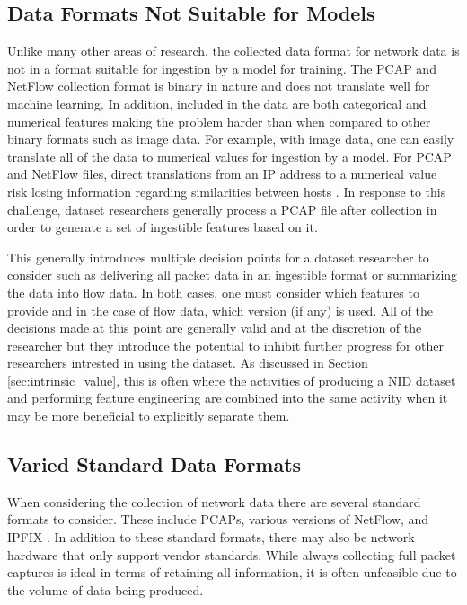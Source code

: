 \documentclass[sigconf]{acmart}
\begin{document}
\subsection{Data Formats Not Suitable for Models}\label{subsec:collectionformat}
Unlike many other areas of research, the collected data format for network data is not in a format suitable for ingestion by a model for training.
The PCAP and NetFlow collection format is binary in nature and does not translate well for machine learning.
In addition, included in the data are both categorical and numerical features making the problem harder than when compared to other binary formats such as image data. 
For example, with image data, one can easily translate all of the data to numerical values for ingestion by a model.
For PCAP and NetFlow files, direct translations from an IP address to a numerical value risk losing information regarding similarities between hosts \cite{ringip2vec}.
In response to this challenge, dataset researchers generally process a PCAP file after collection in order to generate a set of ingestible features based on it.

This generally introduces multiple decision points for a dataset researcher to consider such as delivering all packet data in an ingestible format or summarizing the data into flow data. 
In both cases, one must consider which features to provide and in the case of flow data, which version (if any) is used.
All of the decisions made at this point are generally valid and at the discretion of the researcher but they introduce the potential to inhibit further progress for other researchers intrested in using the dataset.
As discussed in Section \ref{sec:intrinsic_value}, this is often where the activities of producing a NID dataset and performing feature engineering are combined into the same activity when it may be more beneficial to explicitly separate them.

\subsection{Varied Standard Data Formats}\label{subsec:nostandard}
When considering the collection of network data there are several standard formats to consider.
These include PCAPs, various versions of NetFlow, and IPFIX \cite{claise2008specification}.
In addition to these standard formats, there may also be network hardware that only support vendor standards.
While always collecting full packet captures is ideal in terms of retaining all information, it is often unfeasible due to the volume of data being produced.
\end{document}
